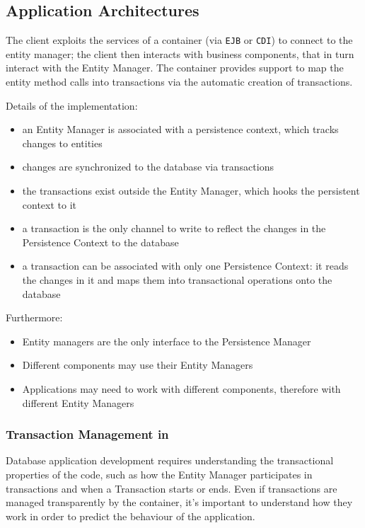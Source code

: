 \documentclass[english]{article}
\begin{document}
\subsection{\jpa Application Architectures}

The client exploits the services of a container (via \texttt{EJB} or \texttt{CDI}) to connect to the entity manager;
the client then interacts with business components, that in turn interact with the Entity Manager.
The container provides support to map the \jpa entity method calls into transactions via the automatic creation of transactions.

Details of the implementation:

\begin{itemize}
  \item an Entity Manager is associated with a persistence context, which tracks changes to entities
  \item changes are synchronized to the database via transactions
  \item the transactions exist outside the Entity Manager, which hooks the persistent context to it
  \item a transaction is the only channel to write to reflect the changes in the Persistence Context to the database
  \item a transaction can be associated with only one Persistence Context: it reads the changes in it and maps them into transactional operations onto the database
\end{itemize}

\bigskip
Furthermore:

\begin{itemize}
  \item Entity managers are the only interface to the Persistence Manager
  \item Different components may use their Entity Managers
  \item Applications may need to work with different components, therefore with different Entity Managers
\end{itemize}

\subsubsection{Transaction Management in \jpa}

Database application development requires understanding the transactional properties of the code, such as
how the Entity Manager participates in transactions and when a Transaction starts or ends.
Even if transactions are managed transparently by the container, it's important to understand how they work in order to predict the behaviour of the application.
\end{document}

